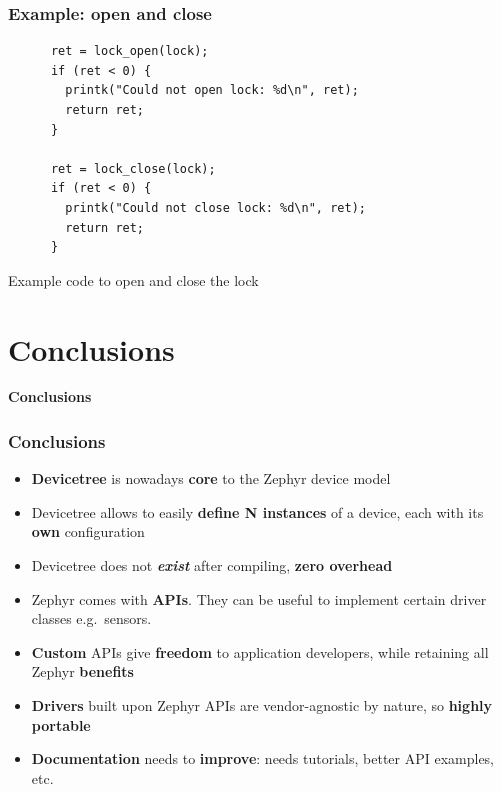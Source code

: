\documentclass[handout]{beamer}
\begin{document}
\begin{frame}[fragile]
  \frametitle{Example: open and close}

  \begin{listing}[H]
    \begin{verbatim}
      ret = lock_open(lock);
      if (ret < 0) {
        printk("Could not open lock: %d\n", ret);
        return ret;
      }

      ret = lock_close(lock);
      if (ret < 0) {
        printk("Could not close lock: %d\n", ret);
        return ret;
      }
    \end{verbatim}
    \caption{Example code to open and close the lock}
  \end{listing}
\end{frame}


\section{Conclusions}

\begin{frame}
  \begin{center}
    \Huge
    \textbf{Conclusions}
  \end{center}
\end{frame}

\begin{frame}
  \frametitle{Conclusions}

  \begin{itemize}
    \item \textbf{Devicetree} is nowadays \textbf{core} to the Zephyr device
          model
    \item Devicetree allows to easily \textbf{define N instances} of a device,
          each with its \textbf{own} configuration
    \item Devicetree does not \textbf{\textit{exist}} after compiling,
          \textbf{zero overhead}
    \item Zephyr comes with \textbf{APIs}. They can be useful to implement
          certain driver classes e.g.\ sensors.
    \item \textbf{Custom} APIs give \textbf{freedom} to application developers,
          while retaining all Zephyr \textbf{benefits}
    \item \textbf{Drivers} built upon Zephyr APIs are vendor-agnostic by nature,
          so \textbf{highly portable}
    \item \textbf{Documentation} needs to \textbf{improve}: needs tutorials,
          better API examples, etc.
  \end{itemize}
\end{frame}
\end{document}
